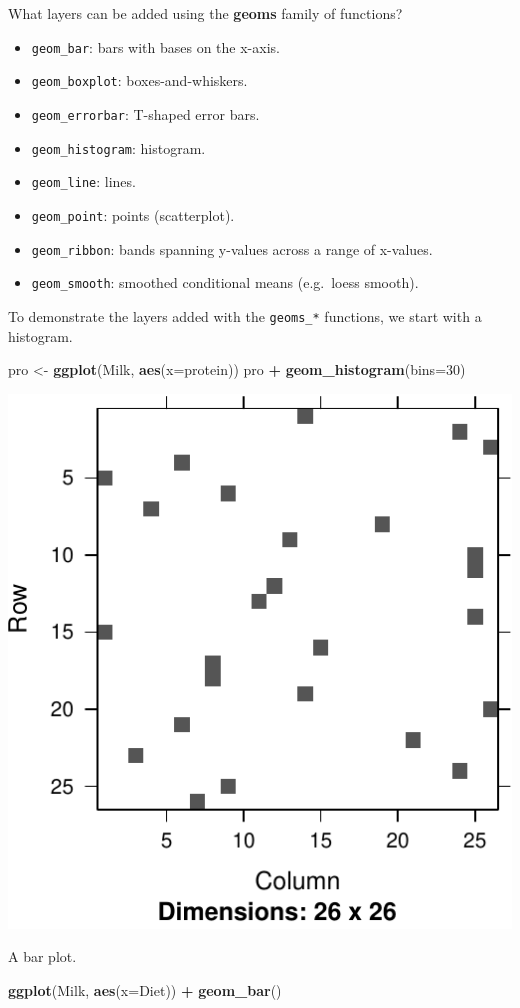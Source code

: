 \documentclass[]{book}
\newenvironment{Shaded}{\begin{snugshade}}{\end{snugshade}}
\newcommand{\KeywordTok}[1]{\textcolor[rgb]{0.13,0.29,0.53}{\textbf{#1}}}
\newcommand{\DataTypeTok}[1]{\textcolor[rgb]{0.13,0.29,0.53}{#1}}
\newcommand{\DecValTok}[1]{\textcolor[rgb]{0.00,0.00,0.81}{#1}}
\newcommand{\StringTok}[1]{\textcolor[rgb]{0.31,0.60,0.02}{#1}}
\newcommand{\OperatorTok}[1]{\textcolor[rgb]{0.81,0.36,0.00}{\textbf{#1}}}
\newcommand{\NormalTok}[1]{#1}
\providecommand{\tightlist}{%
  \setlength{\itemsep}{0pt}\setlength{\parskip}{0pt}}
\theoremstyle{definition}
\theoremstyle{definition}
\theoremstyle{definition}
\theoremstyle{remark}
\begin{document}
What layers can be added using the \textbf{geoms} family of functions?

\begin{itemize}
\tightlist
\item
  \texttt{geom\_bar}: bars with bases on the x-axis.
\item
  \texttt{geom\_boxplot}: boxes-and-whiskers.
\item
  \texttt{geom\_errorbar}: T-shaped error bars.
\item
  \texttt{geom\_histogram}: histogram.
\item
  \texttt{geom\_line}: lines.
\item
  \texttt{geom\_point}: points (scatterplot).
\item
  \texttt{geom\_ribbon}: bands spanning y-values across a range of
  x-values.
\item
  \texttt{geom\_smooth}: smoothed conditional means (e.g.~loess smooth).
\end{itemize}

To demonstrate the layers added with the \texttt{geoms\_*} functions, we
start with a histogram.

\begin{Shaded}
\begin{Highlighting}[]
\NormalTok{pro <-}\StringTok{ }\KeywordTok{ggplot}\NormalTok{(Milk, }\KeywordTok{aes}\NormalTok{(}\DataTypeTok{x=}\NormalTok{protein))}
\NormalTok{pro }\OperatorTok{+}\StringTok{ }\KeywordTok{geom_histogram}\NormalTok{(}\DataTypeTok{bins=}\DecValTok{30}\NormalTok{)}
\end{Highlighting}
\end{Shaded}

\includegraphics[width=0.5\linewidth]{Rcourse_files/figure-latex/unnamed-chunk-272-1}

A bar plot.

\begin{Shaded}
\begin{Highlighting}[]
\KeywordTok{ggplot}\NormalTok{(Milk, }\KeywordTok{aes}\NormalTok{(}\DataTypeTok{x=}\NormalTok{Diet)) }\OperatorTok{+}
\StringTok{  }\KeywordTok{geom_bar}\NormalTok{()}
\end{Highlighting}
\end{Shaded}
\end{document}
